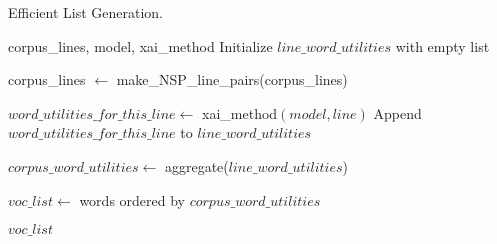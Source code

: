 \begin{algorithm}
\caption{Efficient List Generation.}
\label{alg:efficient-list-generation}
\begin{algorithmic}[1]
\Require corpus\_lines, model, xai\_method
\State Initialize $line\_word\_utilities$ with empty list

    \State corpus\_lines $\gets$ make\_NSP\_line\_pairs(corpus\_lines)
\EndIf

    \State $word\_utilities\_for\_this\_line \gets$ xai\_method$(model, line)$
    \State Append $word\_utilities\_for\_this\_line$ to $line\_word\_utilities$
\EndFor

\State $corpus\_word\_utilities \gets$ aggregate($line\_word\_utilities$)

\State $voc\_list \gets$ words ordered by $corpus\_word\_utilities$

\State \Return $voc\_list$
\end{algorithmic}
\end{algorithm}
